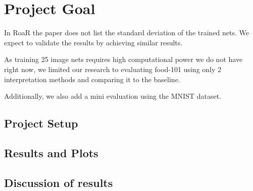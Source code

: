 \section{Project Goal}
In RoaR\cite{hooker2019benchmark} the paper does not list the standard deviation of the trained nets. We expect to validate the results by achieving similar results.

As training 25 image nets requires high computational power we do not have right now, we limited our research to evaluating food-101 \cite{bossard14} using only 2 interpretation methods and comparing it to the baseline.


Additionally, we also add a mini evaluation using the MNIST dataset.



\subsection{Project Setup}




\subsection{Results and Plots}

\subsection{Discussion of results}





